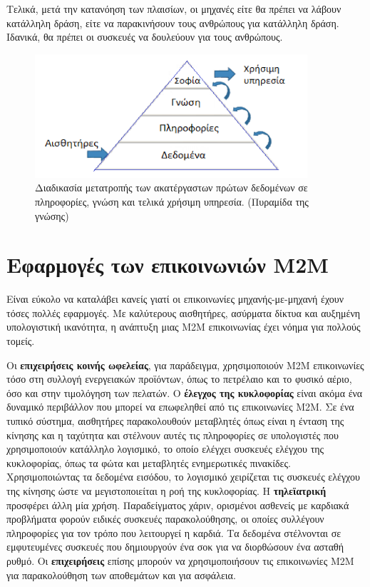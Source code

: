 \documentclass[12pt, a4paper, oneside]{report}
\begin{document}
Τελικά, μετά την κατανόηση των πλαισίων, οι μηχανές είτε θα πρέπει να λάβουν κατάλληλη δράση, είτε να παρακινήσουν τους ανθρώπους για κατάλληλη δράση. Ιδανικά, θα πρέπει οι συσκευές να δουλεύουν για τους ανθρώπους.
\begin{figure}[hb]
\centering
\includegraphics[width=0.9\textwidth]{eikona_06}
\caption[Πυραμίδα της γνώσης]{Διαδικασία μετατροπής των ακατέργαστων πρώτων δεδομένων σε πληροφορίες, γνώση και τελικά χρήσιμη υπηρεσία. (Πυραμίδα της γνώσης)\cite{pyramid}}\label{eik6}
\end{figure}
\clearpage

\section{Εφαρμογές των επικοινωνιών M2M}

Είναι εύκολο να καταλάβει κανείς γιατί οι επικοινωνίες μηχανής-με-μηχανή έχουν τόσες πολλές εφαρμογές. Με καλύτερους αισθητήρες, ασύρματα δίκτυα και αυξημένη υπολογιστική ικανότητα, η ανάπτυξη μιας Μ2Μ επικοινωνίας έχει νόημα για πολλούς τομείς.

Οι \textbf{επιχειρήσεις κοινής ωφελείας}, για παράδειγμα, χρησιμοποιούν Μ2Μ επικοινωνίες τόσο στη συλλογή ενεργειακών προϊόντων, όπως το πετρέλαιο και το φυσικό αέριο, όσο και στην τιμολόγηση των πελατών. Ο \textbf{έλεγχος της κυκλοφορίας} είναι ακόμα ένα δυναμικό περιβάλλον που μπορεί να επωφεληθεί από τις επικοινωνίες Μ2Μ. Σε ένα τυπικό σύστημα, αισθητήρες παρακολουθούν μεταβλητές όπως είναι η ένταση της κίνησης και η ταχύτητα και στέλνουν αυτές τις πληροφορίες σε υπολογιστές που χρησιμοποιούν κατάλληλο λογισμικό, το οποίο ελέγχει συσκευές ελέγχου της κυκλοφορίας, όπως τα φώτα και μεταβλητές ενημερωτικές πινακίδες. Χρησιμοποιώντας τα δεδομένα εισόδου, το λογισμικό χειρίζεται τις συσκευές ελέγχου της κίνησης ώστε να μεγιστοποιείται η ροή της κυκλοφορίας. Η \textbf{τηλεϊατρική} προσφέρει άλλη μία χρήση. Παραδείγματος χάριν, ορισμένοι ασθενείς με καρδιακά προβλήματα φορούν ειδικές συσκευές παρακολούθησης, οι οποίες συλλέγουν πληροφορίες για τον τρόπο που λειτουργεί η καρδιά. Τα δεδομένα στέλνονται σε εμφυτευμένες συσκευές που δημιουργούν ένα σοκ για να διορθώσουν ένα ασταθή ρυθμό. Οι \textbf{επιχειρήσεις} επίσης μπορούν να χρησιμοποιήσουν τις επικοινωνίες Μ2Μ για παρακολούθηση των αποθεμάτων και για ασφάλεια.
\end{document}
